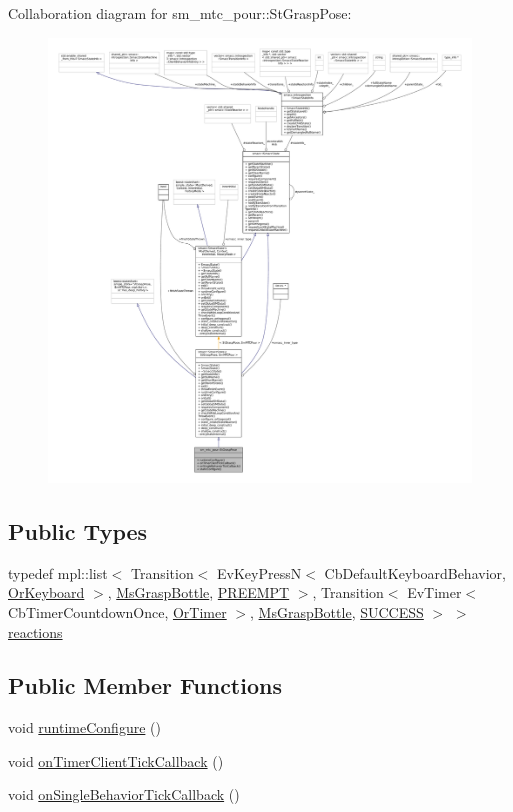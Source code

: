 Collaboration diagram for sm\+\_\+mtc\+\_\+pour\+:\+:St\+Grasp\+Pose\+:
\nopagebreak
\begin{figure}[H]
\begin{center}
\leavevmode
\includegraphics[width=350pt]{structsm__mtc__pour_1_1StGraspPose__coll__graph}
\end{center}
\end{figure}
\subsection*{Public Types}
\begin{DoxyCompactItemize}
\item 
typedef mpl\+::list$<$ Transition$<$ Ev\+Key\+PressN$<$ Cb\+Default\+Keyboard\+Behavior, \hyperlink{classsm__mtc__pour_1_1OrKeyboard}{Or\+Keyboard} $>$, \hyperlink{classsm__mtc__pour_1_1MsGraspBottle}{Ms\+Grasp\+Bottle}, \hyperlink{classPREEMPT}{P\+R\+E\+E\+M\+PT} $>$, Transition$<$ Ev\+Timer$<$ Cb\+Timer\+Countdown\+Once, \hyperlink{classsm__mtc__pour_1_1OrTimer}{Or\+Timer} $>$, \hyperlink{classsm__mtc__pour_1_1MsGraspBottle}{Ms\+Grasp\+Bottle}, \hyperlink{classSUCCESS}{S\+U\+C\+C\+E\+SS} $>$ $>$ \hyperlink{structsm__mtc__pour_1_1StGraspPose_a7b45a3a9aae372102711af66a1eecbda}{reactions}
\end{DoxyCompactItemize}
\subsection*{Public Member Functions}
\begin{DoxyCompactItemize}
\item 
void \hyperlink{structsm__mtc__pour_1_1StGraspPose_a79849e7fda00ba0a864074b24ab72527}{runtime\+Configure} ()
\item 
void \hyperlink{structsm__mtc__pour_1_1StGraspPose_a5198c856e15278e4440ad1a78679ca4e}{on\+Timer\+Client\+Tick\+Callback} ()
\item 
void \hyperlink{structsm__mtc__pour_1_1StGraspPose_aa82db0e88e4268462d3708de8ba96a3e}{on\+Single\+Behavior\+Tick\+Callback} ()
\end{DoxyCompactItemize}
